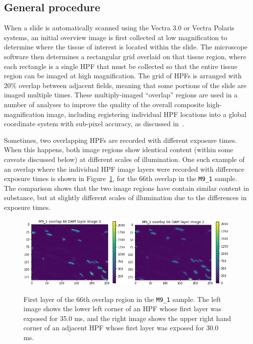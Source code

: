 \documentclass[letterpaper,11pt]{article}
\newcommand{\reffig}[1]{Figure~\ref{#1}}
\begin{document}
\subsection{General procedure}
\label{ssec:general_procedure}

When a slide is automatically scanned using the Vectra 3.0 or Vectra Polaris systems, an initial overview image is first collected at low magnification to determine where the tissue of interest is located within the slide. The microscope software then determines a rectangular grid overlaid on that tissue region, where each rectangle is a single HPF that must be collected so that the entire tissue region can be imaged at high magnification. The grid of HPFs is arranged with 20\% overlap between adjacent fields, meaning that some portions of the slide are imaged multiple times. These multiply-imaged ``overlap'' regions are used in a number of analyses to improve the quality of the overall composite high-magnification image, including registering individual HPF locations into a global coordinate system with sub-pixel accuracy, as discussed in~\cite{Heshy}.

Sometimes, two overlapping HPFs are recorded with different exposure times. When this happens, both image regions show identical content (within some caveats discussed below) at different scales of illumination. One such example of an overlap where the individual HPF image layers were recorded with difference exposure times is shown in \reffig{fig:raw_M9_1_overlap_66}, for the 66th overlap in the \texttt{M9\_1} sample. The comparison shows that the two image regions have contain similar content in substance, but at slightly different scales of illumination due to the differences in exposure times. 

\begin{figure}[!ht]
\centering
\includegraphics[width=0.49\textwidth]{images/methods/raw_M9_1_overlap_66_dapi_image_1}
\includegraphics[width=0.49\textwidth]{images/methods/raw_M9_1_overlap_66_dapi_image_2}
\caption{\footnotesize First layer of the 66th overlap region in the \texttt{M9\_1} sample. The left image shows the lower left corner of an HPF whose first layer was exposed for 35.0 ms, and the right image shows the upper right hand corner of an adjacent HPF whose first layer was exposed for 30.0 ms.}
\label{fig:raw_M9_1_overlap_66}
\end{figure}
\end{document}
